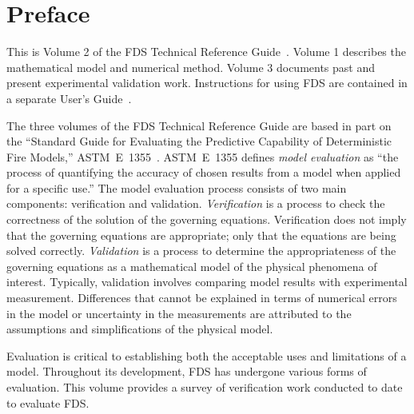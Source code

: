 \documentclass[11pt]{book}
\begin{document}
\newpage






\newpage

\frontmatter

\pagestyle{plain}




\chapter{Preface}

This is Volume 2 of the FDS Technical Reference Guide~\cite{FDS_Tech_Guide}. Volume 1 describes the mathematical model and
numerical method. Volume 3 documents past and present experimental validation work. Instructions for
using FDS are contained in a separate User's Guide~\cite{FDS_Users_Guide}.

The three volumes of the FDS Technical Reference Guide are based in part on the ``Standard Guide for
Evaluating the Predictive Capability of Deterministic Fire Models,'' ASTM~E~1355~\cite{ASTM:E1355}.
ASTM~E~1355 defines {\em model evaluation} as ``the process of quantifying
the accuracy of chosen results from a model when applied for a specific use.''
The model evaluation process consists of two main components: verification and validation.
{\em Verification} is a process to check the correctness of the solution of the
governing equations. Verification does not imply that the governing equations are
appropriate; only that the equations are being solved correctly.
{\em Validation} is a process to determine the appropriateness of the governing equations as a mathematical
model of the physical phenomena of interest. Typically, validation involves comparing
model results with experimental measurement. Differences that cannot be explained in terms of
numerical errors in the model or uncertainty in the measurements
are attributed to the assumptions and simplifications of the physical model.

Evaluation is critical to establishing both the acceptable uses
and limitations of a model. Throughout its development, FDS has undergone various forms of evaluation.
This volume provides a survey of verification work conducted to date to evaluate FDS.



\end{document}

